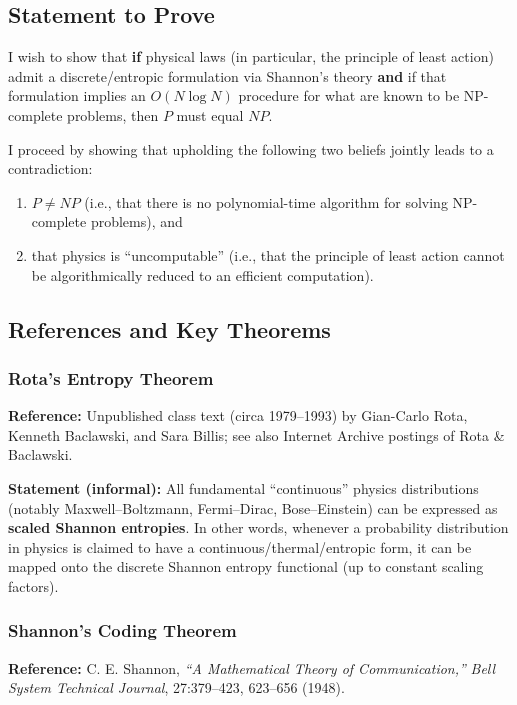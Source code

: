 \documentclass{report}
\begin{document}
\subsection*{Statement to Prove}
I wish to show that \textbf{if} physical laws (in particular, the principle of least action) admit a discrete/entropic formulation via Shannon’s theory \textbf{and} if that formulation implies an \( O(N \log N) \) procedure for what are known to be NP-complete problems, then \( P \) must equal \( NP \).

I proceed by showing that upholding the following two beliefs jointly leads to a contradiction:
\begin{enumerate}
    \item \( P \neq NP \) (i.e., that there is no polynomial-time algorithm for solving NP-complete problems), and  
    \item that physics is ``uncomputable'' (i.e., that the principle of least action cannot be algorithmically reduced to an efficient computation).
\end{enumerate}

\subsection*{References and Key Theorems}

\subsubsection*{Rota’s Entropy Theorem}
\textbf{Reference:} Unpublished class text (circa 1979–1993) by Gian-Carlo Rota, Kenneth Baclawski, and Sara Billis; see also Internet Archive postings of Rota \& Baclawski.  

\textbf{Statement (informal):}  
All fundamental ``continuous'' physics distributions (notably Maxwell–Boltzmann, Fermi–Dirac, Bose–Einstein) can be expressed as \textbf{scaled Shannon entropies}. In other words, whenever a probability distribution in physics is claimed to have a continuous/thermal/entropic form, it can be mapped onto the discrete Shannon entropy functional (up to constant scaling factors).

\subsubsection*{Shannon’s Coding Theorem}
\textbf{Reference:} C. E. Shannon, \textit{“A Mathematical Theory of Communication,”} \textit{Bell System Technical Journal}, 27:379–423, 623–656 (1948).  
\end{document}
